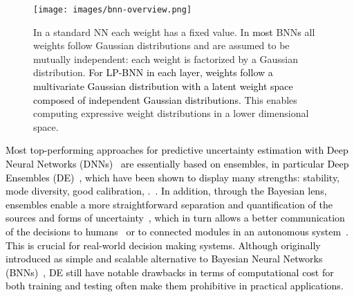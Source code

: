 \documentclass[10pt,twocolumn,letterpaper]{article}
\newcommand{\ab}[1]{\textcolor{black}{#1}}
\newcommand{\method}{LP-BNN\xspace}
\begin{document}
\begin{figure}[t!]
  \renewcommand{\figurename}{Figure}
\renewcommand{\captionfont}{\small}
  \centering
\texttt{[image: images/bnn-overview.png]}
  \caption{
In a standard NN each weight has a fixed value. In 
\ab{most} BNN\ab{s}
all weights follow Gaussian distributions and are assumed to be mutually independent: each weight is factorized by a Gaussian distribution. \ab{For \method  in each layer, weights follow a multivariate Gaussian distribution with a latent weight space composed of independent Gaussian distributions.} This enables computing expressive weight distributions in a lower dimensional space.
}
  \label{fig:teaser}
\vspace{-4mm}
\end{figure}



\ab{
Most top-performing approaches for predictive uncertainty estimation with Deep Neural Networks (DNNs)~\cite{lakshminarayanan2017simple, ashukha2020pitfalls,maddox2019simple,franchi2019tradi} are essentially based on ensembles, in particular Deep Ensembles (DE)~\cite{lakshminarayanan2017simple}, which have been shown to display many strengths: stability, mode diversity, good calibration, \etc.~\cite{fort2019deep}. In addition, through the Bayesian lens, ensembles enable a more straightforward separation and quantification of the sources and forms of uncertainty~\cite{gal2016phd, lakshminarayanan2017simple, malinin2018predictive}, which in turn allows a better communication of the decisions to humans~\cite{bhatt2020uncertainty, kompa2021second} or to connected modules in an autonomous system~\cite{mcallister2017concrete}. This is crucial for real-world decision making systems. Although originally introduced as simple and scalable alternative to Bayesian Neural Networks (BNNs)~\cite{mackay1992practical, neal1995bayesian}, DE still have notable drawbacks in terms of computational cost for both training and testing often make them prohibitive in practical applications. 
}
\end{document}
